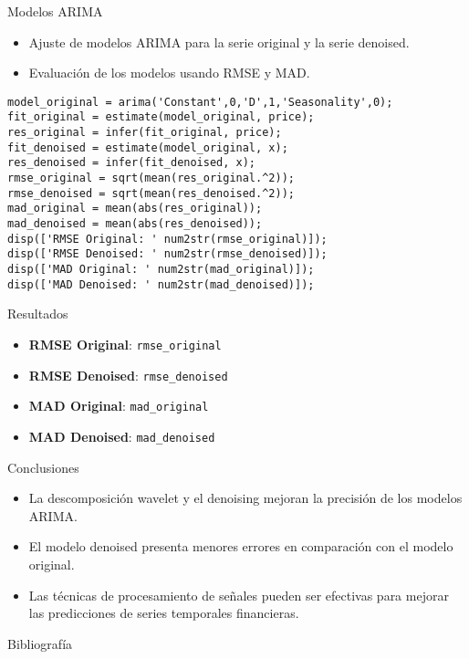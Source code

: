 \documentclass{beamer}
\begin{document}
\begin{frame}{Modelos ARIMA}
\begin{itemize}
    \item Ajuste de modelos ARIMA para la serie original y la serie denoised.
    \item Evaluación de los modelos usando RMSE y MAD.
\end{itemize}
\begin{verbatim}
model_original = arima('Constant',0,'D',1,'Seasonality',0);
fit_original = estimate(model_original, price);
res_original = infer(fit_original, price);
fit_denoised = estimate(model_original, x);
res_denoised = infer(fit_denoised, x);
rmse_original = sqrt(mean(res_original.^2));
rmse_denoised = sqrt(mean(res_denoised.^2));
mad_original = mean(abs(res_original));
mad_denoised = mean(abs(res_denoised));
disp(['RMSE Original: ' num2str(rmse_original)]);
disp(['RMSE Denoised: ' num2str(rmse_denoised)]);
disp(['MAD Original: ' num2str(mad_original)]);
disp(['MAD Denoised: ' num2str(mad_denoised)]);
\end{verbatim}
\end{frame}

\begin{frame}{Resultados}
\begin{itemize}
    \item \textbf{RMSE Original}: \texttt{\num{rmse_original}}
    \item \textbf{RMSE Denoised}: \texttt{\num{rmse_denoised}}
    \item \textbf{MAD Original}: \texttt{\num{mad_original}}
    \item \textbf{MAD Denoised}: \texttt{\num{mad_denoised}}
\end{itemize}
\end{frame}

\begin{frame}{Conclusiones}
\begin{itemize}
    \item La descomposición wavelet y el denoising mejoran la precisión de los modelos ARIMA.
    \item El modelo denoised presenta menores errores en comparación con el modelo original.
    \item Las técnicas de procesamiento de señales pueden ser efectivas para mejorar las predicciones de series temporales financieras.
\end{itemize}
\end{frame}

\begin{frame}{Bibliografía}
\printbibliography
\end{frame}
\end{document}
